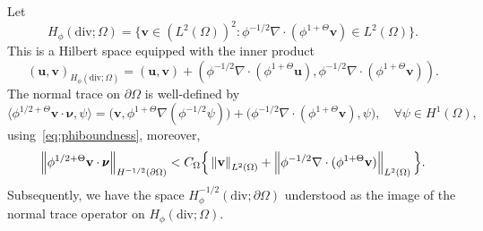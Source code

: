 \documentclass[usenames,dvipsnames,letterpaper,landscape,final]{slides}
\begin{document}
\begin{myslide}
Let
\begin{equation}\label{eq:scaledHspace}
		  H_{\phi}(\text{div}; \Omega) = \Big\{ \mathbf{v} 
		  \in (L^2(\Omega))^2: \phi^{-1/2}\nabla \cdot (\phi^{1+\Theta} \mathbf{v})
		  \in L^2(\Omega) \Big\}.
\end{equation}
This is a Hilbert space equipped with the inner product
\begin{equation}\label{eq:scaledinnerp}
		  (\mathbf{u}, \mathbf{v})_{H_\phi(\text{div};\Omega)} = 
		  (\mathbf{u}, \mathbf{v}) + 
		  (\phi^{-1/2} \nabla \cdot (\phi^{1+\Theta}\mathbf{u}), \phi^{-1/2} \nabla \cdot (\phi^{1+\Theta}\mathbf{v})).
\end{equation}
The normal trace on $\partial \Omega$ is well-defined by
		  \begin{equation}\label{eq:scaledtraceoperator}
		  \langle \phi^{1/2+\Theta} \mathbf{v}\cdot \pmb{\nu}, \psi \rangle = \big(\mathbf{v}, \phi^{1+\Theta}\nabla(\phi^{-1/2}\psi)\big) + 
		  \big(\phi^{-1/2}\nabla \cdot (\phi^{1+\Theta}\mathbf{v}),\psi \big), \quad \forall \psi \in H^1(\Omega),
\end{equation}
		  using~\eqref{eq:phiboundness}, moreover,
\begin{equation}\label{eq:tracescaled}
		  \left\lVert\phi^{1/2+\Theta}\mathbf{v}\cdot \pmb{\nu}\right\rVert_{H^{-1/2}(\partial \Omega)} < C_{\Omega} \Big\{ \left\lVert\mathbf{v}\right\rVert_{L^2(\Omega)} + \left\lVert\phi^{-1/2}\nabla \cdot (\phi^{1+\Theta}\mathbf{v})\right\rVert_{L^2(\Omega)} \Big\}.
\end{equation}
 Subsequently, we have the space $H_\phi^{-1/2}(\text{div};\partial \Omega)$ understood as the image of the normal trace operator on $H_\phi(\text{div};\Omega)$.

\end{myslide}
\end{document}
